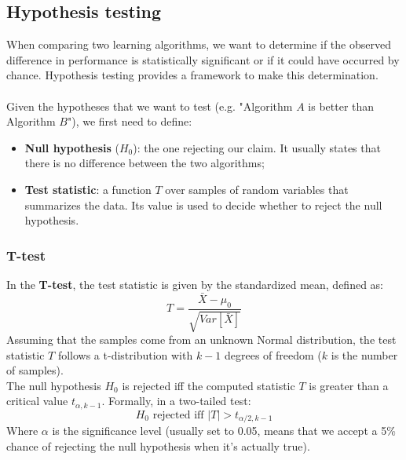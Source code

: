 \subsection{Hypothesis testing}
When comparing two learning algorithms, we want to determine if the observed difference 
in performance is statistically significant or if it could have occurred by chance.
Hypothesis testing provides a framework to make this determination.
\\\\Given the hypotheses that we want to test (e.g. "Algorithm $A$ is better than Algorithm $B$"), we first need to define:
\begin{itemize}
	\item \textbf{Null hypothesis} ($H_0$): the one rejecting our claim. It usually states that there is no difference between the two algorithms;
	\item \textbf{Test statistic}: a function $T$ over samples of random variables that summarizes the data. Its value
	is used to decide whether to reject the null hypothesis.
\end{itemize}

\subsubsection{T-test}
In the \textbf{T-test}, the test statistic is given by the standardized mean, defined as:
\begin{equation}
	T = \frac{\bar{X} - \mu_0}{ \sqrt{Var[\bar{X}]}} 
\end{equation}
Assuming that the samples come from an unknown Normal distribution, the test statistic $T$ follows a 
t-distribution with $k-1$ degrees of freedom ($k$ is the number of samples).
\\The null hypothesis $H_0$ is rejected iff the computed statistic $T$ is greater than a critical value $t_{\alpha, k-1}$.
Formally, in a two-tailed test:
\begin{equation}
	H_0 \text{ rejected iff } |T| > t_{\alpha/2, k-1}
\end{equation}
Where $\alpha$ is the significance level (usually set to 0.05, means that we accept a 
5\% chance of rejecting the null hypothesis when it's actually true).

